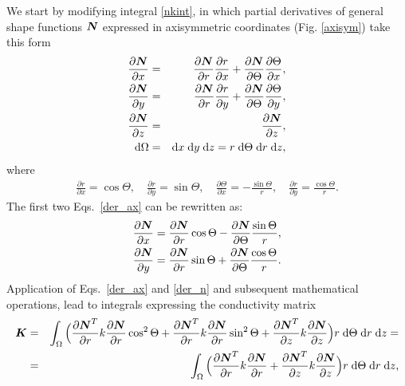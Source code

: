 We start by modifying integral \eqref{nkint}, in which partial derivatives of general shape functions 
$\mbox{\boldmath$N$}$ expressed in axisymmetric coordinates (Fig. \ref{axisym}) take this form
\begin{eqnarray}\label{der_ax}
\frac{\partial \mbox{\boldmath$N$}}{\partial x} &=&  \frac{\partial \mbox{\boldmath$N$}}{\partial r} \frac{\partial r}{\partial x} 
+ \frac{\partial \mbox{\boldmath$N$}}{\partial \Theta} \frac{\partial \Theta}{\partial x},\nonumber\\
\frac{\partial\mbox{\boldmath$N$} }{\partial y} &=&  \frac{\partial\mbox{\boldmath$N$} }{\partial r} \frac{\partial r}{\partial y} 
+ \frac{\partial \mbox{\boldmath$N$}}{\partial \Theta} \frac{\partial \Theta}{\partial y},\\
\frac{\partial \mbox{\boldmath$N$}}{\partial z} &=&  \frac{\partial \mbox{\boldmath$N$}}{\partial z}\nonumber,\\
{\rm d} \Omega &=& {\rm d}x \;{\rm d}y \;{\rm d}z = r \;{\rm d}\Theta \;{\rm d}r \;{\rm d}z,\nonumber
\end{eqnarray}
where
\begin{eqnarray}\label{der_gon}
\frac{\partial r}{\partial x} = \cos \Theta,\quad
\frac{\partial r}{\partial y} = \sin \Theta,\quad
\frac{\partial \Theta}{\partial x} = -\frac{\sin \Theta}{r},\quad
\frac{\partial r}{\partial y} = \frac{\cos \Theta}{r}.
\end{eqnarray}
The first two Eqs.~\eqref{der_ax} can be rewritten as:
\begin{eqnarray}\label{der_n}
\frac{\partial \mbox{\boldmath$N$}}{\partial x} =  \frac{\partial \mbox{\boldmath$N$}}{\partial r} \cos \Theta 
- \frac{\partial \mbox{\boldmath$N$}}{\partial \Theta} \frac{\sin \Theta}{r},\nonumber\\
\frac{\partial \mbox{\boldmath$N$}}{\partial y} =  \frac{\partial \mbox{\boldmath$N$}}{\partial r} \sin \Theta 
+ \frac{\partial \mbox{\boldmath$N$}}{\partial \Theta} \frac{\cos \Theta}{r}.
\end{eqnarray}
Application of Eqs.~\eqref{der_ax} and \eqref{der_n} and subsequent mathematical operations,
lead to integrals expressing the conductivity matrix
\begin{eqnarray}\label{n_int}
\mbox{\boldmath$K$} &=& \int_{\Omega} \Big(\frac{\partial \mbox{\boldmath$N$}^T}{\partial r} k
\frac{\partial \mbox{\boldmath$N$}}{\partial r} \cos^2 \Theta
+ \frac{\partial \mbox{\boldmath$N$}^T}{\partial r}k\frac{\partial \mbox{\boldmath$N$}}{\partial r} \sin^2 \Theta + 
\frac{\partial \mbox{\boldmath$N$}^T}{\partial z}k\frac{\partial \mbox{\boldmath$N$}}{\partial z}\Big)
r \;{\rm d}\Theta \;{\rm d}r \;{\rm d}z = \nonumber\\
&=&\int_{\Omega} \Big(\frac{\partial \mbox{\boldmath$N$}^T}{\partial r}k\frac{\partial \mbox{\boldmath$N$}}{\partial r} + 
\frac{\partial \mbox{\boldmath$N$}^T}{\partial z}k\frac{\partial \mbox{\boldmath$N$}}{\partial z}\Big)
r \;{\rm d}\Theta \;{\rm d}r \;{\rm d}z,
\end{eqnarray}

